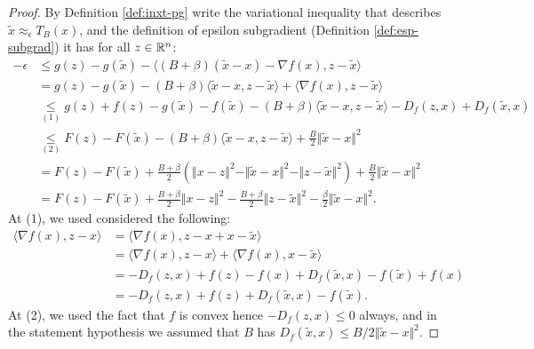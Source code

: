 \documentclass[12pt]{article}
\begin{document}
        \begin{proof}
            By Definition \ref{def:inxt-pg} write the variational inequality that describes $\tilde x \approx_\epsilon T_B(x)$, and the definition of epsilon subgradient (Definition \ref{def:esp-subgrad}) it has for all $z \in \mathbb R^n$: 
            \begin{align*}
                - \epsilon &\le 
                g(z) - g(\tilde x) - \langle (B + \beta)(\tilde x - x) - \nabla f(x), z - \tilde x\rangle
                \\
                &= 
                g(z) - g(\tilde x) 
                - (B + \beta)\langle \tilde x - x, z - \tilde x\rangle
                + \langle \nabla f(x), z - \tilde x\rangle
                \\
                &\underset{(1)}{\le} 
                g(z) + f(z) - g(\tilde x) - f(\tilde x)
                - (B + \beta)\langle \tilde x - x, z - \tilde x\rangle
                - D_f(z, x) + D_f(\tilde x, x)
                \\
                &\underset{(2)}{\le} 
                F(z) - F(\tilde x)
                - (B + \beta)\langle \tilde x - x, z - \tilde x\rangle
                + \frac{B}{2}\Vert \tilde x - x\Vert^2
                \\
                &=
                F(z) - F(\tilde x) + \frac{B + \beta}{2}\left(
                    \Vert x - z\Vert^2
                    - \Vert \tilde x - x\Vert^2
                    - \Vert z - \tilde x\Vert^2
                \right)
                + \frac{B}{2}\Vert \tilde x - x\Vert^2
                \\
                &= 
                F(z) - F(\tilde x)
                + \frac{B + \beta}{2}\Vert x - z\Vert^2
                - \frac{B + \beta}{2}\Vert z - \tilde x\Vert^2
                - \frac{\beta}{2}\Vert \tilde x - x\Vert^2. 
            \end{align*}
            At (1), we used considered the following: 
            \begin{align*}
                \langle \nabla f(x), z - x\rangle &= \langle \nabla f(x), z - x + x - \tilde x\rangle
                \\
                &= \langle \nabla f(x), z - x\rangle + \langle \nabla f(x), x - \tilde x\rangle
                \\
                &= -D_f(z, x) + f(z) - f(x) + D_f(\tilde x, x) - f(\tilde x) + f(x)
                \\
                &= -D_f(z, x) + f(z) + D_f(\tilde x, x) - f(\tilde x). 
            \end{align*}
            At (2), we used the fact that $f$ is convex hence $- D_f(z, x) \le 0$ always, and in the statement hypothesis we assumed that $B$ has $D_f(\tilde x, x) \le B/2\Vert \tilde x - x\Vert^2$. 
        \end{proof}
\end{document}
